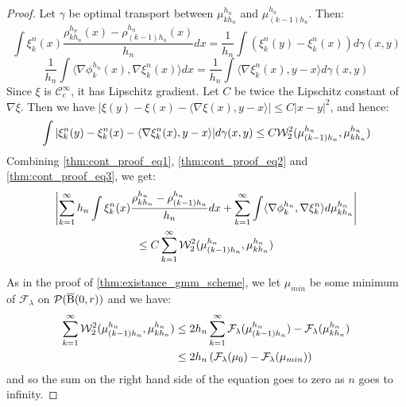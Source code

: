 \begin{proof}
Let $\gamma$ be optimal transport between $\mu_{kh_n}^{h_n}$ and $\mu_{(k-1)h_n}^{h_n}$. Then:
\begin{equation} \label{thm:cont_proof_eq1}
\int \xi_k^n(x) \frac{\rho_{kh_n}^{h_n}(x) - \rho_{(k-1)h_n}^{h_n}(x)}{h_n} dx = \frac{1}{h_n} \int (\xi_k^n(y) - \xi_k^n(x)) d\gamma(x,y)
\end{equation}
\begin{equation} \label{thm:cont_proof_eq2}
\frac{1}{h_n}\int \langle \nabla \phi_k^{h_n}(x) , \nabla \xi_k^n(x) \rangle dx = \frac{1}{h_n} \int \langle \nabla \xi_k^n(x), y-x \rangle d\gamma(x,y) 
\end{equation}
Since $\xi$ is $\mathcal{C}_c^{\infty}$, it has Lipschitz gradient. Let $C$ be twice the Lipschitz constant of $\nabla \xi$. Then we have $| \xi(y) - \xi(x) - \langle \nabla \xi(x), y-x \rangle | \leq C|x- y|^2$, and hence:
\begin{equation} \label{thm:cont_proof_eq3}
\int |\xi_k^n(y) - \xi_k^n(x) - \langle \nabla \xi_k^n(x), y-x \rangle | d \gamma(x,y) \leq C{\cal W}_2^2( \mu_{(k-1)h_n}^{h_n}, \mu_{kh_n}^{h_n})
\end{equation}
Combining \ref{thm:cont_proof_eq1}, \ref{thm:cont_proof_eq2} and \ref{thm:cont_proof_eq3}, we get:
\begin{multline} \label{thm:cont_proof_eq4}
\left|\sum_{k=1}^{\infty} h_n \int \xi_k^n(x) \frac{\rho_{kh_n}^{h_n} - \rho_{(k-1)h_n}^{h_n}}{h_n} dx  + 
\sum_{k=1}^{\infty} \int \langle \nabla \phi_k^{h_n} , \nabla \xi_k^n \rangle d\mu_{kh_n}^{h_n} \right| \\
\leq C\sum_{k=1}^{\infty} {\cal W}_2^2(\mu_{(k-1)h_n}^{h_n}, \mu_{kh_n}^{h_n})
\end{multline}

As in the proof of \ref{thm:existance_gmm_scheme}, we let $\mu_{min}$ be some minimum of $\mathcal{F}_{\lambda}$ on $\mathcal{P}(\operatorname{\overline{B}}(0,r))$ and we have:
\begin{equation} \label{thm:cont_proof_eq5}
\begin{aligned}
\sum_{k=1}^{\infty} {\cal W}_2^2(\mu_{(k-1)h_n}^{h_n}, \mu_{kh_n}^{h_n}) & \leq  2 h_n \sum_{k=1}^{\infty} \mathcal{F}_{\lambda}(\mu_{(k-1)h_n}^{h_n}) - \mathcal{F}_{\lambda}(\mu_{kh_n}^{h_n}) \\ & \leq 2h_n \left(\mathcal{F}_{\lambda}(\mu_0) - \mathcal{F}_{\lambda}(\mu_{min}) \right)
\end{aligned}
\end{equation}
and so the sum on the right hand side of the equation goes to zero as $n$ goes to infinity.


\end{proof}
